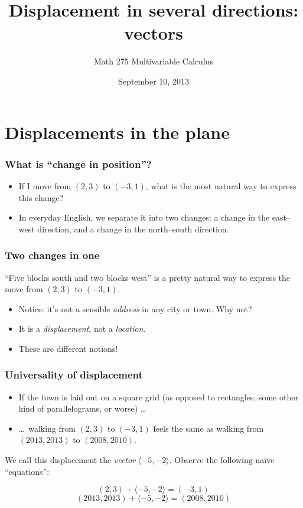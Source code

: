 \documentclass[11pt,ignorenonframetext,aspectratio=169]{beamer}
\title{Displacement in several directions: vectors}
\author{Math 275 Multivariable Calculus}
\date{September 10, 2013 }
\begin{document}
\frame{\titlepage}

\section{Displacements in the plane}

\begin{frame}\frametitle{What is ``change in position''?}

\begin{itemize}[<+->]
\item
  If I move from $(2,3)$ to $(-3, 1)$, what is the most natural way to
  express this change?
\item
  In everyday English, we separate it into two changes: a change in the
  east--west direction, and a change in the north--south direction.
\end{itemize}

\end{frame}

\begin{frame}\frametitle{Two changes in one}

``Five blocks south and two blocks west'' is a pretty natural way to
express the move from $(2,3)$ to $(-3, 1)$.

\begin{itemize}

\item
  Notice: it's not a sensible \emph{address} in any city or town. Why
  not?
\item
  It is a \emph{displacement}, not a \emph{location}.
\item
  These are different notions!
\end{itemize}

\end{frame}

\begin{frame}\frametitle{Universality of displacement}

\begin{itemize}

\item
  If the town is laid out on a square grid (as opposed to rectangles,
  some other kind of parallelograms, or worse) \ldots
\item
  \ldots~walking from $(2,3)$ to $(-3, 1)$ feels the same as walking
  from $(2013,2013)$ to $(2008,2010)$.
\end{itemize}

We call this displacement the \emph{vector} $\langle -5, -2 \rangle$.
Observe the following na\"ive ``equations'':

\begin{equation*}
(2,3) + \langle -5, -2 \rangle = (-3, 1)
\end{equation*}
\begin{equation*}
(2013,2013) + \langle -5, -2 \rangle = (2008,2010)
\end{equation*}

\end{frame}
\end{document}
